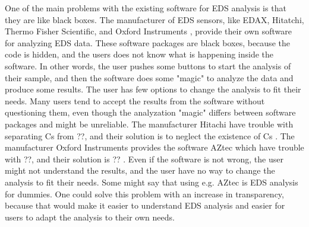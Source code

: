 %
%


One of the main problems with the existing software for EDS analysis is that they are like black boxes.
The manufacturer of EDS sensors, like EDAX, Hitatchi, Thermo Fisher Scientific, and Oxford Instruments , provide their own software for analyzing EDS data.
These software packages are black boxes, because the code is hidden, and the users does not know what is happening inside the software.
In other words, the user pushes some buttons to start the analysis of their sample, and then the software does some "magic" to analyze the data and produce some results.
The user has few options to change the analysis to fit their needs.
Many users tend to accept the results  from the software without questioning them, even though the analyzation "magic" differs between software packages and might be unreliable.
The manufacturer Hitachi have trouble with separating Cs from ??, and their solution is to neglect the existence of Cs .
The manufacturer Oxford Instruments provides the software AZtec which have trouble with ??, and their solution is ?? .
Even if the software is not wrong, the user might not understand the results, and the user have no way to change the analysis to fit their needs.
Some might say that using e.g. AZtec is EDS analysis for dummies.
One could solve this problem with an increase in transparency, because that would make it easier to understand EDS analysis and easier for users to adapt the analysis to their own needs.








